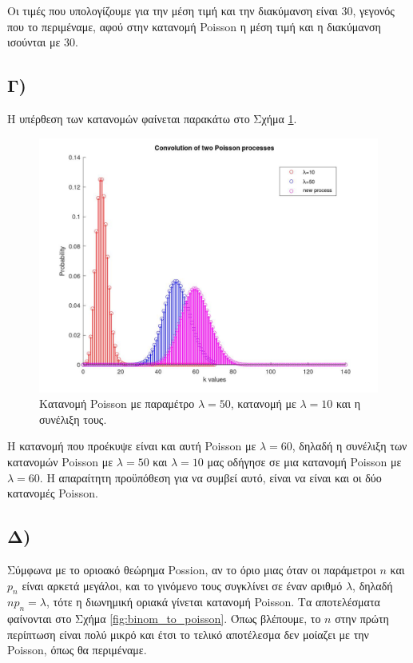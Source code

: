 \documentclass{article}
\newcommand{\english}[1]{\foreignlanguage{english}{{#1}}}
\begin{document}
Οι τιμές που υπολογίζουμε για την μέση τιμή και την διακύμανση είναι $30$, γεγονός που το περιμέναμε, αφού στην κατανομή Poisson η μέση τιμή και η διακύμανση ισούνται με $30$.

\subsection*{Γ)}

Η υπέρθεση των κατανομών φαίνεται παρακάτω στο Σχήμα \ref{fig:poisson_conv}.

\begin{figure}
    \centering
    \includegraphics[width=\textwidth]{poisson_conv.jpg}
    \caption{Κατανομή \english{Poisson} με παραμέτρο  $λ = 50$, κατανομή με $λ = 10$ και η συνέλιξη τους.}
    \label{fig:poisson_conv}
\end{figure}


Η κατανομή που προέκυψε είναι και αυτή \english{Poisson} με $λ = 60$, δηλαδή η συνέλιξη των κατανομών \english{Poisson} με $λ = 50$ και $λ = 10$ μας οδήγησε σε μια κατανομή \english{Poisson} με $λ = 60$. H απαραίτητη προϋπόθεση για να συμβεί αυτό, είναι να είναι και οι δύο κατανομές \english{Poisson}.

\subsection*{Δ)}


Σύμφωνα με το οριοακό θεώρημα \english{Possion}, αν το όριο μιας όταν οι παράμετροι $n$ και $p_n$ είναι αρκετά μεγάλοι, και το γινόμενο τους συγκλίνει σε έναν αριθμό $λ$, δηλαδή $np_n = λ$, τότε η διωνημική οριακά γίνεται κατανομή \english{Poisson}. Τα αποτελέσματα φαίνονται στο Σχήμα \ref{fig:binom_to_poisson}. Όπως βλέπουμε, το $n$ στην πρώτη περίπτωση είναι πολύ μικρό και έτσι το τελικό αποτέλεσμα δεν μοίαζει με την \english{Poisson}, όπως θα περιμέναμε.
\end{document}
